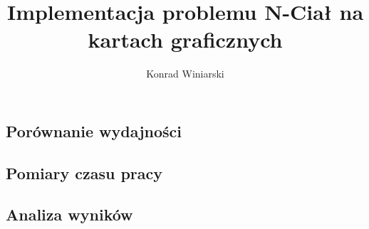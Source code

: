 \documentclass[12pt]{article}
\author{Konrad Winiarski}
\title{Implementacja problemu N-Ciał na kartach graficznych}
\begin{document}
\maketitle
\pagebreak
\tableofcontents
\pagebreak

\begin{flushleft}














\section { Porównanie wydajności }

\subsection {Pomiary czasu pracy}
\subsection {Analiza wyników}





\end{flushleft}
\end{document}
